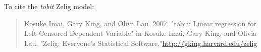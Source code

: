 To cite the \emph{ tobit } Zelig model:
 \begin{verse}
 Kosuke Imai, Gary King, and Oliva Lau. 2007. "tobit: Linear regression for Left-Censored Dependent Variable" in Kosuke Imai, Gary King, and Olivia Lau, "Zelig: Everyone's Statistical Software,"\url{http://gking.harvard.edu/zelig} 
\end{verse}